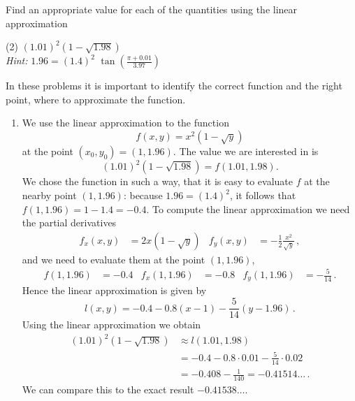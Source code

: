 \begin{question}
Find an appropriate value for each of the quantities using the linear approximation
\begin{tasks}(2)
\task
$(1.01)^2 \left( 1 - \displaystyle\sqrt{1.98} \right)$ \\
{\itshape Hint:} $1.96 = (1.4)^2$
\task
$\tan \left(\displaystyle\frac{\pi + 0.01}{3.97}\right)$
\end{tasks}
\end{question}

\begin{solution} In these problems it is important to identify the correct function and the right point, where to approximate the function.
\begin{enumerate}
\item
We use the linear approximation to the function
\[
f(x,y) = x^2 \left( 1- \sqrt{y}\right)
\]
at the point $(x_0,y_0) = (1, 1.96)$. The value we are interested in is 
\[
(1.01)^2 \left( 1 - \displaystyle\sqrt{1.98} \right) = f(1.01, 1.98).
\]
We chose the function in such a way, that it is easy to evaluate $f$ at the nearby point $(1,1.96)$: because $1.96=(1.4)^2$, it follows that $f(1,1.96) = 1-1.4 = -0.4$.
To compute the linear approximation we need the partial derivatives
\begin{align*}
f_x(x,y) &= 2x \left(1 - \sqrt y\right) &
f_y(x,y) &= -\frac 12 \frac{x^2}{\sqrt y}\,,
\end{align*}
and we need to evaluate them at the point $(1, 1.96)$,
\begin{align*}
f(1,1.96)&= -0.4 &
f_x(1,1.96) &= -0.8 &
f_y(1,1.96) &= -\frac 5{14}\,.
\end{align*}
Hence the linear approximation is given by
\[
l(x,y) = -0.4 -0.8 (x - 1) - \frac 5{14}(y-1.96)\,.
\]
Using the linear approximation we obtain
\begin{align*}
(1.01)^2 \left( 1 - \displaystyle\sqrt{1.98} \right) &\approx l(1.01, 1.98) \\
&= -0.4 - 0.8 \cdot 0.01 - \frac 5{14} \cdot 0.02 \\
&= -0.408 - \frac 1{140} = -0.41514\dots\,.
\end{align*}
We can compare this to the exact result $-0.41538\dots$.


\end{enumerate}
\end{solution}

